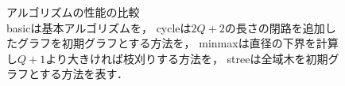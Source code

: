 \documentclass[11pt]{jarticle}
\begin{document}
\begin{figure}[H]
  \centering
  \hfill
  \caption{アルゴリズムの性能の比較 \\
    basicは基本アルゴリズムを，
    cycleは$2Q+2$の長さの閉路を追加したグラフを初期グラフとする方法を，
    minmaxは直径の下界を計算し$Q+1$より大きければ枝刈りする方法を，
    streeは全域木を初期グラフとする方法を表す．
  }
  \label{fig:result}
\end{figure}
\end{document}
